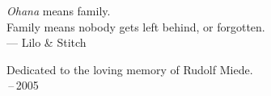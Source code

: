 
\thispagestyle{empty}

\vspace*{3cm}

\begin{center}
    \emph{Ohana} means family. \\
    Family means nobody gets left behind, or forgotten. \\ \medskip
    --- Lilo \& Stitch
\end{center}

\medskip

\begin{center}
    Dedicated to the loving memory of Rudolf Miede. \\ \,--\,2005
\end{center}
